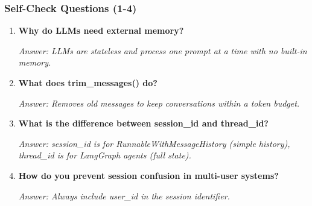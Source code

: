 \documentclass[aspectratio=169,11pt]{beamer}
\begin{document}
\begin{frame}[fragile]
  \frametitle{Self-Check Questions (1-4)}
  \begin{enumerate}
    \item \textbf{Why do LLMs need external memory?}
    \begin{small}
      \textit{Answer: LLMs are stateless and process one prompt at a time with no built-in memory.}
    \end{small}

    \item \textbf{What does trim\_messages() do?}
    \begin{small}
      \textit{Answer: Removes old messages to keep conversations within a token budget.}
    \end{small}

    \item \textbf{What is the difference between session\_id and thread\_id?}
    \begin{small}
      \textit{Answer: session\_id is for RunnableWithMessageHistory (simple history), thread\_id is for LangGraph agents (full state).}
    \end{small}

    \item \textbf{How do you prevent session confusion in multi-user systems?}
    \begin{small}
      \textit{Answer: Always include user\_id in the session identifier.}
    \end{small}
  \end{enumerate}
\end{frame}
\end{document}
